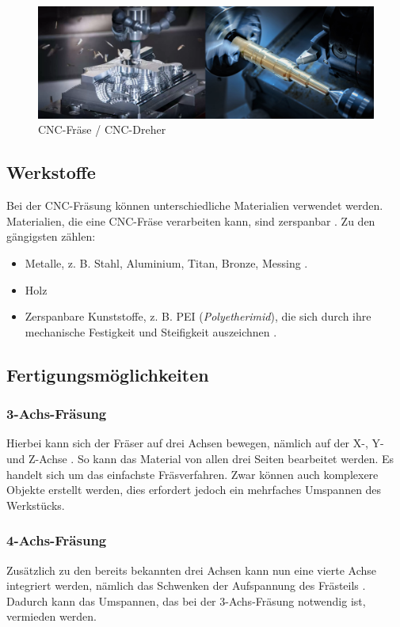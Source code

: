 \begin{figure}[H]
	\centering
	\includegraphics[width=0.6\linewidth]{images/CNCDrehenFraesen.png}
	\caption[CNC-Fräse / CNC-Dreher]{CNC-Fräse / CNC-Dreher}
	\label{fig:CNC Drehen vs Fraesen}
\end{figure}


\subsection{Werkstoffe}
Bei der CNC-Fräsung können unterschiedliche Materialien verwendet werden. Materialien, die eine CNC-Fräse verarbeiten kann, sind zerspanbar  \parencite{PEIZerspannung}. Zu den gängigsten zählen:

\begin{itemize}
	\item Metalle, z. B. Stahl, Aluminium, Titan, Bronze, Messing \parencite{CNCFraesen3}.
	\item Holz
	\item Zerspanbare Kunststoffe, z. B. PEI (\textit{Polyetherimid}), die sich durch ihre mechanische Festigkeit und Steifigkeit auszeichnen \parencite{PEIKunststoffPolyetherimid}.
\end{itemize}


\subsection{Fertigungsmöglichkeiten}

\subsubsection{3-Achs-Fräsung}
Hierbei kann sich der Fräser auf drei Achsen bewegen, nämlich auf der X-, Y- und Z-Achse \parencite{Fraesen345Achs}. So kann das Material von allen drei Seiten bearbeitet werden. Es handelt sich um das einfachste Fräsverfahren. Zwar können auch komplexere Objekte erstellt werden, dies erfordert jedoch ein mehrfaches Umspannen des Werkstücks.

\subsubsection{4-Achs-Fräsung}
Zusätzlich zu den bereits bekannten drei Achsen kann nun eine vierte Achse integriert werden, nämlich das Schwenken der Aufspannung des Frästeils \parencite{Fraesen345Achs}. Dadurch kann das Umspannen, das bei der 3-Achs-Fräsung notwendig ist, vermieden werden.

